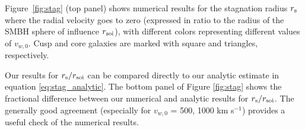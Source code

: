 \documentclass[usenatbib,fleqn]{mn2e}
\begin{document}
Figure~\ref{fig:stag} (top panel) shows numerical results for the
stagnation radius $r_{\rm s}$ where the radial velocity goes to zero
(expressed in ratio to the radius of the SMBH sphere of influence
$r_{\rm soi}$), with different colors representing different values of
$v_{w,0}$.  Cusp and core galaxies are marked with square and
triangles, respectively.  

Our results for $r_{\rm s}/r_{\rm soi}$ can be compared directly to our analytic estimate in equation \ref{eq:stag_analytic}.  The bottom panel of Figure \ref{fig:stag} shows the fractional difference between our numerical and analytic results for $r_{\rm s}/r_{\rm soi}$.  The generally good agreement (especially for $v_{w,0}$ = 500, 1000 km s$^{-1}$) provides a useful check of the numerical results.

\end{document}

